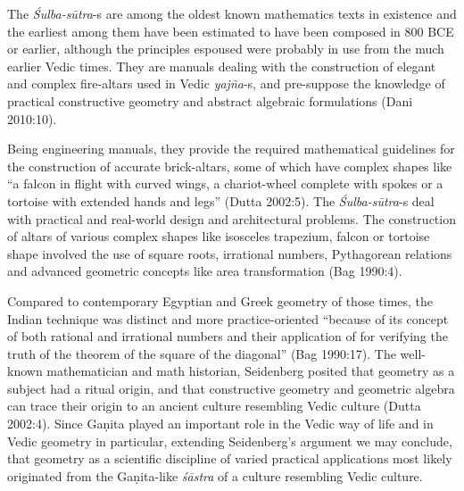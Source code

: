 The {\sl Śulba-sūtra}-s are among the oldest known mathematics texts in existence and the earliest among them have been estimated to have been composed in 800 BCE or earlier, although the principles espoused were probably in use from the much earlier Vedic times. They are manuals dealing with the construction of elegant and complex fire-altars used in Vedic {\sl yajña}-s, and pre-suppose the knowledge of practical constructive geometry and abstract algebraic formulations (Dani 2010:10). 

Being engineering manuals, they provide the required mathematical guidelines for the construction of accurate brick-altars, some of which have complex shapes like ``a falcon in flight with curved wings, a chariot-wheel complete with spokes or a tortoise with extended hands and legs'' (Dutta 2002:5). The {\sl Śulba-sūtra}-s deal with practical and real-world design and architectural problems. The construction of altars of various complex shapes like isosceles trapezium, falcon or tortoise shape involved the use of square roots, irrational numbers, Pythagorean relations and advanced geometric concepts like area transformation (Bag 1990:4).

Compared to contemporary Egyptian and Greek geometry of those times, the Indian technique was distinct and more practice-oriented ``because of its concept of both rational and irrational numbers and their application of for verifying the truth of the theorem of the square of the diagonal'' (Bag 1990:17). The well-known mathematician and math historian, Seidenberg posited that geometry as a subject had a ritual origin, and that constructive geometry and geometric algebra can trace their origin to an ancient culture resembling Vedic culture (Dutta 2002:4). Since Gaṇita played an important role in the Vedic way of life and in Vedic geometry in particular, extending Seidenberg’s argument we may conclude, that geometry as a scientific discipline of varied practical applications most likely originated from the Gaṇita-like {\sl śāstra} of a culture resembling Vedic culture.

